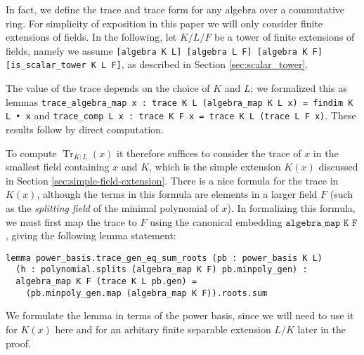 \documentclass[a4paper,USenglish,cleveref, autoref, thm-restate]{lipics-v2021}
\newcommand{\lean}[1]{\texttt{#1}\xspace} %
\DeclareMathOperator{\Tr}{Tr}
\begin{document}
In fact, we define the trace and trace form for any algebra over a commutative ring.
For simplicity of exposition in this paper we will only consider finite extensions of fields. %
In the following, let $K / L / F$ be a tower of finite extensions of fields, namely we assume \lean{[algebra K L] [algebra L F] [algebra K F] [is\_scalar\_tower K L F]}, as described in Section \ref{sec:scalar_tower}.

The value of the trace depends on the choice of $K$ and $L$;
we formalized this as lemmas \lean{trace\_algebra\_map x : trace K L (algebra\_map K L x) = findim K L • x}
and \lean{trace\_comp L x : trace K F x = trace K L (trace L F x)}.
These results follow by direct computation.

To compute $\Tr_{K : L}(x)$ it therefore suffices to consider the trace of $x$ in the smallest field containing $x$ and $K$, which is the simple extension $K(x)$ discussed in Section \ref{sec:simple-field-extension}.
There is a nice formula for the trace in $K(x)$, although the terms in this formula are elements in a larger field $F$
(such as the \emph{splitting field} of the minimal polynomial of $x$).
In formalizing this formula, we must first map the trace to $F$ using the canonical embedding $\lean{algebra\_map K F}$,
giving the following lemma statement:
\begin{lstlisting}
lemma power_basis.trace_gen_eq_sum_roots (pb : power_basis K L)
  (h : polynomial.splits (algebra_map K F) pb.minpoly_gen) :
  algebra_map K F (trace K L pb.gen) =
    (pb.minpoly_gen.map (algebra_map K F)).roots.sum
\end{lstlisting}
We formulate the lemma in terms of the power basis, since we will need to use it for $K(x)$ here
and for an arbitary finite separable extension $L / K$ later in the proof.
\end{document}
